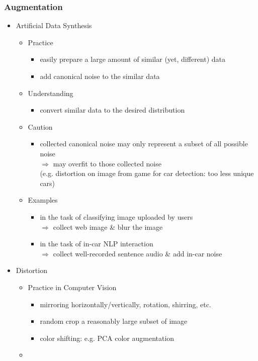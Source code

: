 \subsubsection{Augmentation}
\begin{itemize}
\item Artificial Data Synthesis
	\begin{itemize}
	\item Practice
		\begin{itemize}
		\item easily prepare a large amount of similar (yet, different) data
		\item add canonical noise to the similar data
		\end{itemize}
	\item Understanding
		\begin{itemize}
		\item convert similar data to the desired distribution
		\end{itemize}
	\item Caution
		\begin{itemize}
		\item collected canonical noise may only represent a subset of all possible noise \\
		$\Rightarrow$ may overfit to those collected noise \\
		(e.g. distortion on image from game for car detection: too less unique cars)
		\end{itemize}
	\item Examples
		\begin{itemize}
		\item in the task of classifying image uploaded by users \\ 
		$\Rightarrow$ collect web image \& blur the image
		\item in the task of in-car NLP interaction \\
		$\Rightarrow$ collect well-recorded sentence audio \& add in-car noise
		\end{itemize}
	\end{itemize}
	
\item Distortion
	\begin{itemize}
	\item Practice in Computer Vision
		\begin{itemize}
		\item mirroring horizontally/vertically, rotation, shirring, etc.
		\item random crop a reasonably large subset of image
		\item color shifting: e.g. PCA color augmentation
		\end{itemize}
	\item 
	\end{itemize}
\end{itemize}
